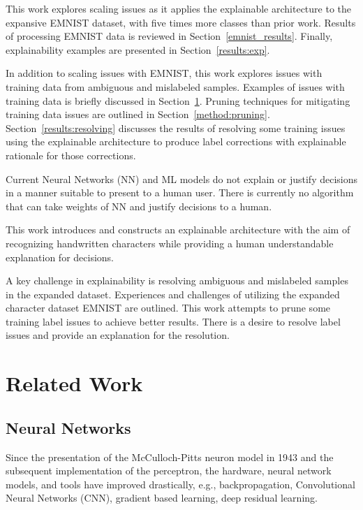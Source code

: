 \documentclass[conference]{IEEEtran}
\begin{document}
This work explores scaling issues as it applies the explainable architecture to
the expansive EMNIST dataset, with five times more classes than prior work.
Results of processing EMNIST data is reviewed in Section~\ref{emnist_results}.
Finally, explainability examples are presented in
Section~\ref{results:exp}.

In addition to scaling issues with EMNIST, this work explores issues with
training data from ambiguous and mislabeled samples.  Examples of issues with
training data is briefly discussed in Section~\ref{related_work}. Pruning
techniques for mitigating training data issues are outlined in
Section~\ref{method:pruning}. Section~\ref{results:resolving} discusses the
results of resolving some training issues using the explainable architecture to
produce label corrections with explainable rationale for those corrections.


Current Neural Networks (NN) and ML models do not explain or justify decisions
in a manner suitable to present to a human user.  There is currently no
algorithm that can take weights of NN and justify decisions to a human.

This work introduces and constructs an
explainable architecture with the aim of recognizing handwritten characters while
providing a human understandable explanation for decisions.

A key challenge in explainability is resolving ambiguous and mislabeled samples
in the expanded dataset.  Experiences and challenges of utilizing the expanded
character dataset EMNIST are outlined.  This work attempts to prune some
training label issues to achieve better results.  There is a desire to resolve
label issues  and provide an explanation for the resolution.

\section{Related Work}
\label{related_work}

\subsection{Neural Networks}

Since the presentation of the McCulloch-Pitts neuron
model\cite{McCulloch1943-MCCALC-5} in 1943 and the subsequent implementation of
the perceptron\cite{rosenblatt1957perceptron}, the hardware, neural network
models, and tools have improved drastically, e.g.,
backpropagation\cite{6795724}, Convolutional Neural Networks
(CNN)\cite{fukushima1982neocognitron}, gradient based learning\cite{726791},
deep residual learning\cite{7780459}.
\end{document}
